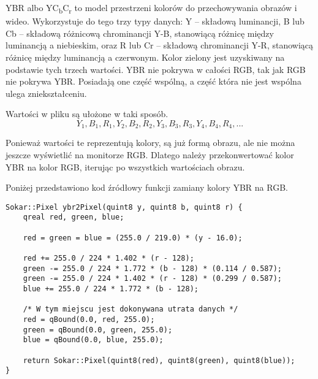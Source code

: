 \label{sec:algorithm-pixmap-ybr}

\par
YBR albo YC\textsubscript{b}C\textsubscript{r} to model przestrzeni kolorów do przechowywania obrazów i wideo.
Wykorzystuje do tego trzy typy danych: Y – składową luminancji, B lub Cb – składową różnicową chrominancji Y-B, stanowiącą różnicę między luminancją a niebieskim, oraz R lub Cr – składową chrominancji Y-R, stanowiącą różnicę między luminancją a czerwonym.
Kolor zielony jest uzyskiwany na podstawie tych trzech wartości.
YBR nie pokrywa w całości RGB, tak jak RGB nie pokrywa YBR.
Posiadają one część wspólną, a część która nie jest wspólna ulega zniekształceniu.

\par
Wartości w pliku \DICOM są ułożone w taki sposób.
\[Y_1, B_1, R_1, Y_2, B_2, R_2, Y_3, B_3, R_3, Y_4, B_4, R_4,  ...\]

\par
Ponieważ wartości te reprezentują kolory, są już formą obrazu, ale nie można jeszcze wyświetlić na monitorze RGB.
Dlatego należy przekonwertować kolor YBR na kolor RGB, iterując po wszystkich wartościach obrazu.

\par
Poniżej przedstawiono kod źródłowy funkcji zamiany kolory YBR na RGB.

\begin{lstlisting}
Sokar::Pixel ybr2Pixel(quint8 y, quint8 b, quint8 r) {
    qreal red, green, blue;

    red = green = blue = (255.0 / 219.0) * (y - 16.0);

    red += 255.0 / 224 * 1.402 * (r - 128);
    green -= 255.0 / 224 * 1.772 * (b - 128) * (0.114 / 0.587);
    green -= 255.0 / 224 * 1.402 * (r - 128) * (0.299 / 0.587);
    blue += 255.0 / 224 * 1.772 * (b - 128);

    /* W tym miejscu jest dokonywana utrata danych */
    red = qBound(0.0, red, 255.0);
    green = qBound(0.0, green, 255.0);
    blue = qBound(0.0, blue, 255.0);

    return Sokar::Pixel(quint8(red), quint8(green), quint8(blue));
}
\end{lstlisting}